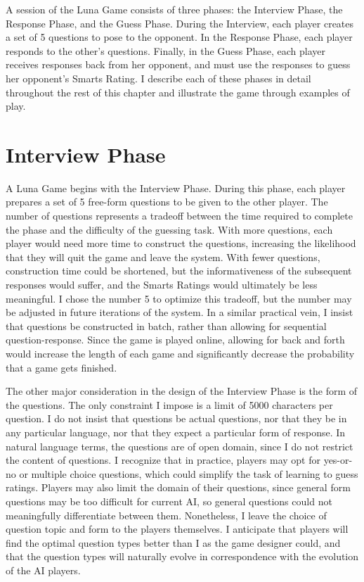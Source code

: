 A session of the Luna Game consists of three phases: the Interview Phase, the Response Phase, and the Guess Phase. During the Interview, each player creates a set of 5 questions to pose to the opponent. In the Response Phase, each player responds to the other's questions. Finally, in the Guess Phase, each player receives responses back from her opponent, and must use the responses to guess her opponent's Smarts Rating. I describe each of these phases in detail throughout the rest of this chapter and illustrate the game through examples of play.

\section{Interview Phase}

A Luna Game begins with the Interview Phase. During this phase, each player prepares a set of 5 free-form questions to be given to the other player. The number of questions represents a tradeoff between the time required to complete the phase and the difficulty of the guessing task. With more questions, each player would need more time to construct the questions, increasing the likelihood that they will quit the game and leave the system. With fewer questions, construction time could be shortened, but the informativeness of the subsequent responses would suffer, and the Smarts Ratings would ultimately be less meaningful. I chose the number 5 to optimize this tradeoff, but the number may be adjusted in future iterations of the system. In a similar practical vein, I insist that questions be constructed in batch, rather than allowing for sequential question-response. Since the game is played online, allowing for back and forth would increase the length of each game and significantly decrease the probability that a game gets finished.

The other major consideration in the design of the Interview Phase is the form of the questions. The only constraint I impose is a limit of 5000 characters per question. I do not insist that questions be actual questions, nor that they be in any particular language, nor that they expect a particular form of response. In natural language terms, the questions are of open domain, since I do not restrict the content of questions. I recognize that in practice, players may opt for yes-or-no or multiple choice questions, which could simplify the task of learning to guess ratings. Players may also limit the domain of their questions, since general form questions may be too difficult for current AI, so general questions could not meaningfully differentiate between them. Nonetheless, I leave the choice of question topic and form to the players themselves. I anticipate that players will find the optimal question types better than I as the game designer could, and that the question types will naturally evolve in correspondence with the evolution of the AI players.

